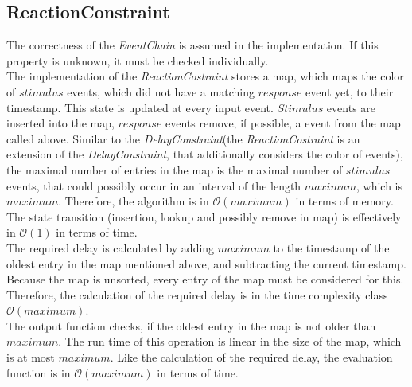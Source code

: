 \subsection{ReactionConstraint}
	The correctness of the \textit{EventChain} is assumed in the implementation. If this property is unknown, it must be checked individually.\\
	The implementation of the \emph{ReactionCostraint} stores a map, which maps the color of $stimulus$ events, which did not have a matching $response$ event yet, to their timestamp. This state is updated at every input event. $Stimulus$ events are inserted into the map, $response$ events remove, if possible, a event from the map called above. Similar to the \emph{DelayConstraint}(the \emph{ReactionCostraint} is an extension of the \emph{DelayConstraint}, that additionally considers the color of events), the maximal number of entries in the map is the maximal number of $stimulus$ events, that could possibly occur in an interval of the length $maximum$, which is $maximum$.  Therefore, the algorithm is in $\mathcal{O}(maximum)$ in terms of memory. The state transition (insertion, lookup and possibly remove in map) is effectively in $\mathcal{O}(1)$ in terms of time.\\
	The required delay is calculated by adding $maximum$ to the timestamp of the oldest entry in the map mentioned above, and subtracting the current timestamp. Because the map is unsorted, every entry of the map must be considered for this. Therefore, the calculation of the required delay is in the time complexity class $\mathcal{O}(maximum)$.\\
	The output function checks, if the oldest entry in the map is not older than $maximum$. The run time of this operation is linear in the size of the map, which is at most $maximum$. Like the calculation of the required delay, the evaluation function is in $\mathcal{O}(maximum)$ in terms of time.
	
